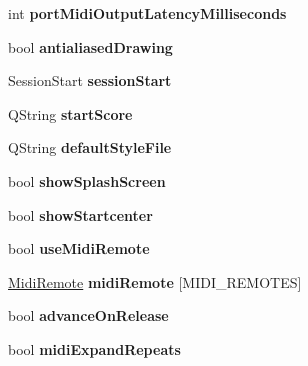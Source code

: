 \begin{DoxyCompactItemize}
int {\bfseries port\+Midi\+Output\+Latency\+Milliseconds}
\item 
\mbox{\label{struct_ms_1_1_preferences_ad6b570a26a511ee7cae24d0e2a06976b}} 
bool {\bfseries antialiased\+Drawing}
\item 
\mbox{\label{struct_ms_1_1_preferences_a2ff1c128d96f938fbef79a2d526c9154}} 
Session\+Start {\bfseries session\+Start}
\item 
\mbox{\label{struct_ms_1_1_preferences_a87cd5afedb481dd0e29c5379bac98e8b}} 
Q\+String {\bfseries start\+Score}
\item 
\mbox{\label{struct_ms_1_1_preferences_a4e6fb7e9e4075b394071a4f6e524c483}} 
Q\+String {\bfseries default\+Style\+File}
\item 
\mbox{\label{struct_ms_1_1_preferences_ab105b389f05f53d6a414b69d1f02c571}} 
bool {\bfseries show\+Splash\+Screen}
\item 
\mbox{\label{struct_ms_1_1_preferences_a08df83ddf4dee7a08d647ff923515e41}} 
bool {\bfseries show\+Startcenter}
\item 
\mbox{\label{struct_ms_1_1_preferences_a28f5ca33ad77126eea88535b4ba64f56}} 
bool {\bfseries use\+Midi\+Remote}
\item 
\mbox{\label{struct_ms_1_1_preferences_afd0ae6c22f4149cf502b46ee2f47dea9}} 
\hyperlink{struct_ms_1_1_midi_remote}{Midi\+Remote} {\bfseries midi\+Remote} \mbox{[}M\+I\+D\+I\+\_\+\+R\+E\+M\+O\+T\+ES\mbox{]}
\item 
\mbox{\label{struct_ms_1_1_preferences_ae9fca9853ddb8cb96e532b2f7ac85b40}} 
bool {\bfseries advance\+On\+Release}
\item 
\mbox{\label{struct_ms_1_1_preferences_ace6b915f9bd6ec0c65bf1df1ed5bfead}} 
bool {\bfseries midi\+Expand\+Repeats}
\item 
\mbox{\label{struct_ms_1_1_preferences_ac7d7a9cfc599d90636e8b1be32d4c0e9}} 

\end{DoxyCompactItemize}
